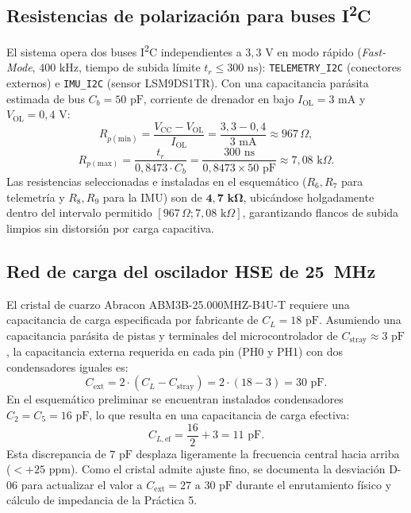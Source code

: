 \documentclass[11pt,a4paper]{article}
\begin{document}
\subsection{Resistencias de polarización para buses I\textsuperscript{2}C}
El sistema opera dos buses I\textsuperscript{2}C independientes a $3{,}3\text{ V}$ en modo rápido (\emph{Fast-Mode}, $400\text{ kHz}$, tiempo de subida límite $t_r \le 300\text{ ns}$): \texttt{TELEMETRY\_I2C} (conectores externos) e \texttt{IMU\_I2C} (sensor LSM9DS1TR). Con una capacitancia parásita estimada de bus $C_b = 50\text{ pF}$, corriente de drenador en bajo $I_{\text{OL}} = 3\text{ mA}$ y $V_{\text{OL}} = 0{,}4\text{ V}$:
\begin{equation}
R_{p(\text{min})} = \frac{V_{\text{CC}} - V_{\text{OL}}}{I_{\text{OL}}} = \frac{3{,}3 - 0{,}4}{3\text{ mA}} \approx 967\,\Omega,
\end{equation}
\begin{equation}
R_{p(\text{max})} = \frac{t_r}{0{,}8473 \cdot C_b} = \frac{300\text{ ns}}{0{,}8473 \times 50\text{ pF}} \approx 7{,}08\text{ k}\Omega.
\end{equation}
Las resistencias seleccionadas e instaladas en el esquemático ($R_6, R_7$ para telemetría y $R_8, R_9$ para la IMU) son de $\mathbf{4{,}7\text{ k}\Omega}$, ubicándose holgadamente dentro del intervalo permitido $[967\,\Omega; 7{,}08\text{ k}\Omega]$, garantizando flancos de subida limpios sin distorsión por carga capacitiva.

\subsection{Red de carga del oscilador HSE de 25~MHz}
El cristal de cuarzo Abracon ABM3B-25.000MHZ-B4U-T requiere una capacitancia de carga especificada por fabricante de $C_L = 18\text{ pF}$. Asumiendo una capacitancia parásita de pistas y terminales del microcontrolador de $C_{\text{stray}} \approx 3\text{ pF}$, la capacitancia externa requerida en cada pin (PH0 y PH1) con dos condensadores iguales es:
\begin{equation}
C_{\text{ext}} = 2 \cdot (C_L - C_{\text{stray}}) = 2 \cdot (18 - 3) = 30\text{ pF}.
\end{equation}
En el esquemático preliminar se encuentran instalados condensadores $C_2 = C_5 = 16\text{ pF}$, lo que resulta en una capacitancia de carga efectiva:
\begin{equation}
C_{L, \text{ef}} = \frac{16}{2} + 3 = 11\text{ pF}.
\end{equation}
Esta discrepancia de $7\text{ pF}$ desplaza ligeramente la frecuencia central hacia arriba ($<+25\text{ ppm}$). Como el cristal admite ajuste fino, se documenta la desviación D-06 para actualizar el valor a $C_{\text{ext}} = 27\text{ a }30\text{ pF}$ durante el enrutamiento físico y cálculo de impedancia de la Práctica 5.
\end{document}

